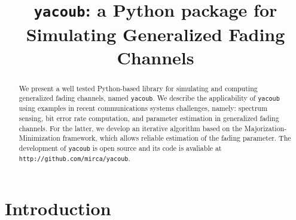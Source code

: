 \documentclass[conference, 10pt]{IEEEtran}
\begin{document}
\title{\texttt{yacoub}: a Python package for Simulating Generalized Fading Channels}

\author{
}

\maketitle

\begin{abstract}
    We present a well tested Python-based library for simulating and computing
    generalized fading channels, named \texttt{yacoub}. We describe the
    applicability of \texttt{yacoub} using examples in recent communications
    systems challenges, namely: spectrum sensing, bit error rate computation,
    and parameter estimation in generalized fading channels. For the latter,
    we develop an iterative algorithm based on the Majorization-Minimization
    framework, which allows reliable estimation of the fading parameter.
    The development of \texttt{yacoub} is open source and its code
    is avaliable at \texttt{http://github.com/mirca/yacoub}.
\end{abstract}

\IEEEpeerreviewmaketitle
\section{Introduction}
\end{document}

